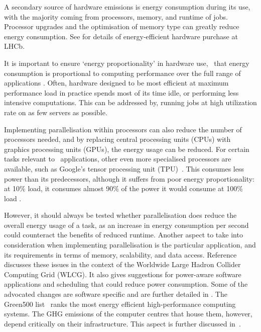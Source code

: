 \documentclass[../SustainableHEP.tex]{subfiles}
\begin{document}
A secondary source of hardware emissions is energy consumption during its use, with the majority coming from processors, memory, and runtime of jobs.  Processor upgrades and the optimisation of memory type can greatly reduce energy consumption. See  for details of energy-efficient hardware purchase at LHCb.

It is important to ensure `energy proportionality' in hardware use, \ie\ that energy consumption is proportional to computing performance over the full range of applications \cite{energy-prop-computing}.    Often, hardware designed to be most efficient at maximum performance load in practice spends most of its time idle, or performing less intensive computations. This can be addressed by, \eg running jobs at high utilization rate on as few servers as possible.  

Implementing parallelisation within processors can also reduce the number of processors needed, and by replacing central processing units (CPUs) with graphics processing units (GPUs), the energy usage can be reduced.  For certain tasks relevant to \ACR\ applications, other even more specialised processors are available, such as Google's tensor processing unit (TPU)~\cite{Tensor}.  This consumes less power than its predecessors, although it suffers from poor energy proportionality: at 10\% load, it consumes almost 90\% of the power it would consume at 100\% load \cite{TensorPerformance}.

However, it should always be tested whether parallelisation does reduce the overall energy usage of a task, as an increase in energy consumption per second could counteract the benefits of reduced runtime.  Another aspect to take into consideration when implementing parallelisation is the particular application, and its requirements in terms of memory, scalability, and data access. Reference~\cite{Abdurachmanov:2014xka} discusses these issues in the context of the Worldwide Large Hadron Collider Computing Grid (WLCG).  It also gives suggestions for power-aware software applications and scheduling that could reduce power consumption.  Some of the advocated changes are software specific and are further detailed in . The Green500 list~\cite{GreenList} ranks the most energy efficient high-performance computing systems. 
The GHG emissions of the computer centres that house them, however, depend critically on their infrastructure. This aspect is further discussed in~.

\end{document}
